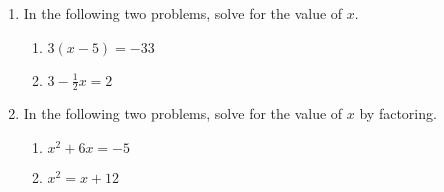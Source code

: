 \documentclass[12pt, twoside]{article}
\begin{document}
\begin{enumerate}[itemsep=0.5cm]
\newpage
\item In the following two problems, solve for the value of $x$.
\begin{multicols}{2}
  \begin{enumerate}
    \item   $3(x-5)=-33$ \vspace{6cm}
    \item   $3-\frac{1}{2} x=2$ \vspace{6cm}
  \end{enumerate}
\end{multicols}

\item In the following two problems, solve for the value of $x$ by factoring.
  \begin{multicols}{2}
    \begin{enumerate}
      \item   $x^2+6x=-5$ \vspace{6cm}
      \item   $x^2=x+12$ \vspace{6cm}
    \end{enumerate}
  \end{multicols}

\end{enumerate}
\end{document}
